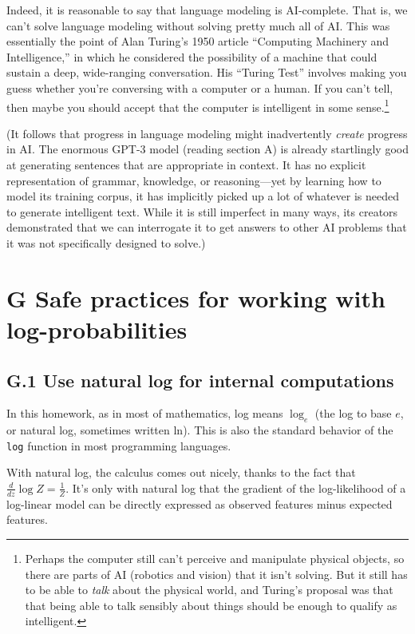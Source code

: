 Indeed, it is reasonable to say that language modeling is AI-complete. That is, we can’t solve language modeling without solving pretty much all of AI. This was essentially the point of Alan Turing’s 1950 article “Computing Machinery and Intelligence,” in which he considered the possibility of a machine that could sustain a deep, wide-ranging conversation. His “Turing Test” involves making you guess whether you’re conversing with a computer or a human. If you can’t tell, then maybe you should accept that the computer is intelligent in some sense.\footnote{Perhaps the computer still can’t perceive and manipulate physical objects, so there are parts of AI (robotics and vision) that it isn’t solving. But it still has to be able to \textit{talk} about the physical world, and Turing’s proposal was that that being able to talk sensibly about things should be enough to qualify as intelligent.}  

(It follows that progress in language modeling might inadvertently \textit{create} progress in AI. The enormous GPT-3 model (reading section A) is already startlingly good at generating sentences that are appropriate in context. It has no explicit representation of grammar, knowledge, or reasoning—yet by learning how to model its training corpus, it has implicitly picked up a lot of whatever is needed to generate intelligent text. While it is still imperfect in many ways, its creators demonstrated that we can interrogate it to get answers to other AI problems that it was not specifically designed to solve.)  

\section*{G Safe practices for working with log-probabilities}

\subsection*{G.1 Use natural log for internal computations}
In this homework, as in most of mathematics, log means $\log_e$ (the log to base $e$, or natural log, sometimes written ln). This is also the standard behavior of the \texttt{log} function in most programming languages.  

With natural log, the calculus comes out nicely, thanks to the fact that $\frac{d}{dz}\log Z = \frac{1}{Z}$. It’s only with natural log that the gradient of the log-likelihood of a log-linear model can be directly expressed as observed features minus expected features.  


